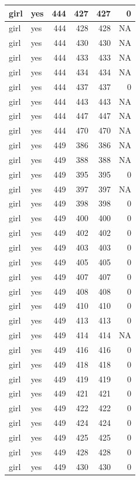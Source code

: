 \documentclass[man]{apa6}
\begin{document}
\begin{tabular}{l|l|r|r|r|r}
\hline
girl & yes & 444 & 427 & 427 & 0\\
\hline
girl & yes & 444 & 428 & 428 & NA\\
\hline
girl & yes & 444 & 430 & 430 & NA\\
\hline
girl & yes & 444 & 433 & 433 & NA\\
\hline
girl & yes & 444 & 434 & 434 & NA\\
\hline
girl & yes & 444 & 437 & 437 & 0\\
\hline
girl & yes & 444 & 443 & 443 & NA\\
\hline
girl & yes & 444 & 447 & 447 & NA\\
\hline
girl & yes & 444 & 470 & 470 & NA\\
\hline
girl & yes & 449 & 386 & 386 & NA\\
\hline
girl & yes & 449 & 388 & 388 & NA\\
\hline
girl & yes & 449 & 395 & 395 & 0\\
\hline
girl & yes & 449 & 397 & 397 & NA\\
\hline
girl & yes & 449 & 398 & 398 & 0\\
\hline
girl & yes & 449 & 400 & 400 & 0\\
\hline
girl & yes & 449 & 402 & 402 & 0\\
\hline
girl & yes & 449 & 403 & 403 & 0\\
\hline
girl & yes & 449 & 405 & 405 & 0\\
\hline
girl & yes & 449 & 407 & 407 & 0\\
\hline
girl & yes & 449 & 408 & 408 & 0\\
\hline
girl & yes & 449 & 410 & 410 & 0\\
\hline
girl & yes & 449 & 413 & 413 & 0\\
\hline
girl & yes & 449 & 414 & 414 & NA\\
\hline
girl & yes & 449 & 416 & 416 & 0\\
\hline
girl & yes & 449 & 418 & 418 & 0\\
\hline
girl & yes & 449 & 419 & 419 & 0\\
\hline
girl & yes & 449 & 421 & 421 & 0\\
\hline
girl & yes & 449 & 422 & 422 & 0\\
\hline
girl & yes & 449 & 424 & 424 & 0\\
\hline
girl & yes & 449 & 425 & 425 & 0\\
\hline
girl & yes & 449 & 428 & 428 & 0\\
\hline
girl & yes & 449 & 430 & 430 & 0\\

\end{tabular}
\end{document}
